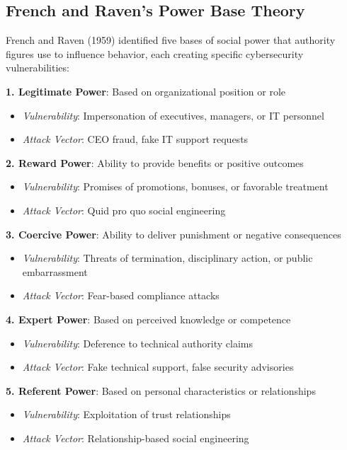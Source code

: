 \documentclass[11pt,a4paper]{article}
\begin{document}
\subsection{French and Raven's Power Base Theory}

French and Raven (1959) identified five bases of social power that authority figures use to influence behavior, each creating specific cybersecurity vulnerabilities:

\textbf{1. Legitimate Power}: Based on organizational position or role
\begin{itemize}
\item \textit{Vulnerability}: Impersonation of executives, managers, or IT personnel
\item \textit{Attack Vector}: CEO fraud, fake IT support requests
\end{itemize}

\textbf{2. Reward Power}: Ability to provide benefits or positive outcomes
\begin{itemize}
\item \textit{Vulnerability}: Promises of promotions, bonuses, or favorable treatment
\item \textit{Attack Vector}: Quid pro quo social engineering
\end{itemize}

\textbf{3. Coercive Power}: Ability to deliver punishment or negative consequences
\begin{itemize}
\item \textit{Vulnerability}: Threats of termination, disciplinary action, or public embarrassment
\item \textit{Attack Vector}: Fear-based compliance attacks
\end{itemize}

\textbf{4. Expert Power}: Based on perceived knowledge or competence
\begin{itemize}
\item \textit{Vulnerability}: Deference to technical authority claims
\item \textit{Attack Vector}: Fake technical support, false security advisories
\end{itemize}

\textbf{5. Referent Power}: Based on personal characteristics or relationships
\begin{itemize}
\item \textit{Vulnerability}: Exploitation of trust relationships
\item \textit{Attack Vector}: Relationship-based social engineering
\end{itemize}
\end{document}
